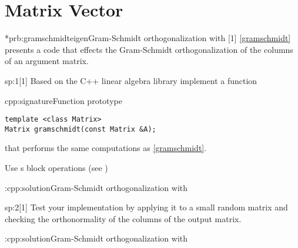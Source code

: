 \chapter{Matrix Vector}

\begin{samproblem}*{prb:gramschmidteigen}{Gram-Schmidt orthogonalization with \eigen{}}[1]{
\cref{gramschmidt} presents a \matlab{} code that effects the Gram-Schmidt
  orthogonalization of the columns of an argument matrix. 
}

\begin{subproblem}{sp:1}[1]
  Based on the C++ linear algebra library \eigen{} implement a function

  \begin{samcode}[C++-code]{cpp:signature}{Function prototype}
    \begin{lstlisting}[style=cpp]
template <class Matrix>  
Matrix gramschmidt(const Matrix &A);
    \end{lstlisting}
  \end{samcode}
  that performs the same computations as \cref{gramschmidt}. 

  \begin{samhint}
    Use \eigen{}s block operations (see \href{https://eigen.tuxfamily.org/dox/group__TutorialBlockOperations.html}{\ExternalLinkSymb})
  \end{samhint}

  \begin{samsolution}
    \begin{samcode}[C++-code]{\cpl:cpp:solution}{Gram-Schmidt orthogonalization with \eigen{}}
      
    \end{samcode}
  \end{samsolution}

\end{subproblem}

\begin{subproblem}{sp:2}[1]
  \label{sp:strassen:2}
  Test your implementation by applying it to a small random matrix
  and checking the orthonormality of the columns of the output
  matrix.

  \begin{samsolution}
    \begin{samcode}[C++-code]{\cpl:cpp:solution}{Gram-Schmidt orthogonalization with \eigen{}}
    \end{samcode}
  \end{samsolution}

\end{subproblem}

\end{samproblem}


